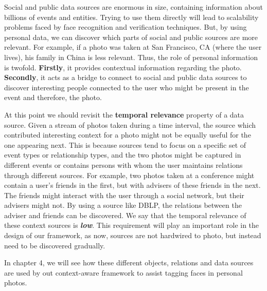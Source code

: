 Social and public data sources are enormous in size, containing information about billions of events and entities. Trying to use them directly will lead to scalability problems faced by face recognition and verification techniques. But, by using personal data, we can discover which parts of social and public sources are more relevant. For example, if a photo was taken at San Francisco, CA (where the user lives), his family in China is less relevant. Thus, the role of personal information is twofold. \textbf{Firstly}, it provides contextual information regarding the photo. \textbf{Secondly}, it acts as a bridge to connect to social and public data sources to discover interesting people connected to the user who might be present in the event and therefore, the photo.

At this point we should revisit the \textbf{temporal relevance} property of a data source. Given a stream of photos taken during a time interval, the source which contributed interesting context for a photo might not be equally useful for the one appearing next. This is because sources tend to focus on a specific set of event types or relationship types, and the two photos might be captured in different events or contains persons with whom the user maintains relations through different sources. For example, two photos taken at a conference might contain a user's friends in the first, but with advisers of these friends in the next. The friends might interact with the user through a social network, but their advisers might not. By using a source like DBLP, the relations between the adviser and friends can be discovered. We say that the temporal relevance of these context sources is \textbf{\textit{low}}. This requirement will play an important role in the design of our framework, as now, sources are not hardwired to photo, but instead need to be discovered gradually.

In chapter 4, we will see how these different objects, relations and data sources are used by out context-aware framework to assist tagging faces in personal photos.